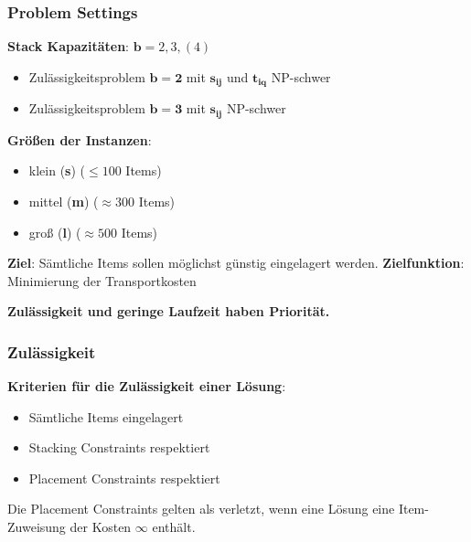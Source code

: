 \documentclass{beamer}
\begin{document}
\begin{frame}
\frametitle{Problem Settings}

\textbf{Stack Kapazitäten}: $\boldsymbol{b} = 2, 3, (4)$
\begin{itemize}
  \item Zulässigkeitsproblem $\boldsymbol{b=2}$ mit $\boldsymbol{s_{ij}}$ und $\boldsymbol{t_{iq}}$ NP-schwer
  \item Zulässigkeitsproblem $\boldsymbol{b=3}$ mit $\boldsymbol{s_{ij}}$ NP-schwer
\end{itemize}

\textbf{Größen der Instanzen}:
\begin{itemize}
  \item klein (\textbf{s}) ($\leq 100$ Items)
  \item mittel (\textbf{m}) ($\approx 300$ Items)
  \item groß (\textbf{l}) ($\approx 500$ Items)\newline
\end{itemize}

\textbf{Ziel}: Sämtliche Items sollen möglichst günstig eingelagert werden.\newline
\textbf{Zielfunktion}: Minimierung der Transportkosten\newline

\textbf{Zulässigkeit und geringe Laufzeit haben Priorität.}\newline
\end{frame}

\begin{frame}
\frametitle{Zulässigkeit}
\textbf{Kriterien für die Zulässigkeit einer Lösung}:
\begin{itemize}
  \item Sämtliche Items eingelagert
  \item Stacking Constraints respektiert
  \item Placement Constraints respektiert
\end{itemize}

Die Placement Constraints gelten als verletzt, wenn eine Lösung eine Item-Zuweisung der Kosten $\infty$ enthält.
\end{frame}
\end{document}
